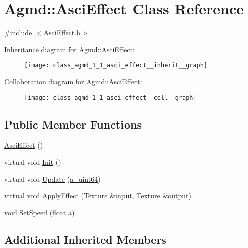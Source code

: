 \hypertarget{class_agmd_1_1_asci_effect}{\section{Agmd\+:\+:Asci\+Effect Class Reference}
\label{class_agmd_1_1_asci_effect}
}


{\ttfamily \#include $<$Asci\+Effect.\+h$>$}



Inheritance diagram for Agmd\+:\+:Asci\+Effect\+:\nopagebreak
\begin{figure}[H]
\begin{center}
\leavevmode
\texttt{[image: class\_agmd\_1\_1\_asci\_effect\_\_inherit\_\_graph]}
\end{center}
\end{figure}


Collaboration diagram for Agmd\+:\+:Asci\+Effect\+:\nopagebreak
\begin{figure}[H]
\begin{center}
\leavevmode
\texttt{[image: class\_agmd\_1\_1\_asci\_effect\_\_coll\_\_graph]}
\end{center}
\end{figure}
\subsection*{Public Member Functions}
\begin{DoxyCompactItemize}
\item 
\hyperlink{class_agmd_1_1_asci_effect_a90e9456454102f304f5980c4d0f8bd0f}{Asci\+Effect} ()
\item 
virtual void \hyperlink{class_agmd_1_1_asci_effect_aea65718dfabaf2864b642f4d6fd0fe4f}{Init} ()
\item 
virtual void \hyperlink{class_agmd_1_1_asci_effect_a417d09c081e54e9d441a364116a82100}{Update} (\hyperlink{_common_defines_8h_a6c5192ec3c55d6e5b13d2dbaa082bdea}{a\+\_\+uint64})
\item 
virtual void \hyperlink{class_agmd_1_1_asci_effect_ac00621025bf283158a57290eff9829e6}{Apply\+Effect} (\hyperlink{class_agmd_1_1_texture}{Texture} \&input, \hyperlink{class_agmd_1_1_texture}{Texture} \&output)
\item 
void \hyperlink{class_agmd_1_1_asci_effect_a8b2a79fc64315ed913c67ed6dcb5b433}{Set\+Speed} (float a)
\end{DoxyCompactItemize}
\subsection*{Additional Inherited Members}


